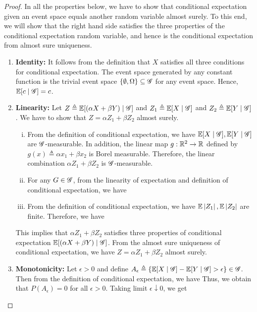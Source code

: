 \documentclass[letterpaper,10pt,english]{article}
\begin{document}
\begin{proof}
In all the properties below, we have to show that conditional expectation given an event space equals another random variable almost surely. 
To this end, we will show that the right hand side satisfies the three properties of the conditional expectation random variable, 
and hence is the conditional expectation from almost sure uniqueness.  
\begin{enumerate}
\item \textbf{Identity:} It follows from the definition that $X$ satisfies all three conditions for conditional expectation.  
The event space generated by any constant function is the trivial event space $\left\{\emptyset, \Omega\right\} \subseteq \mathscr{G}$ for any event space. 
Hence, $\mathbb{E}[c\mid \mathscr{G}] = c$.  
\item \textbf{Linearity:} 
Let $Z \triangleq \mathbb{E}[(\alpha X + \beta Y) \mid \mathscr{G}]$ and $Z_1 \triangleq \mathbb{E}[X\mid\mathscr{G}]$ and $Z_2\triangleq\mathbb{E}[Y\mid\mathscr{G}]$. 
We have to show that $Z = \alpha Z_1+ \beta Z_2$ almost surely. 
\begin{enumerate}[(i)]
\item From the definition of conditional expectation, we have $\mathbb{E}[X\mid\mathscr{G}], \mathbb{E}[Y\mid\mathscr{G}]$ are $\mathscr{G}$-measurable. 
In addition, the linear map $g: \mathbb{R}^2\to\mathbb{R}$ defined by $g(x) \triangleq \alpha x_1 + \beta x_2$ is Borel measurable. 
Therefore, the linear combination $\alpha Z_1 + \beta Z_2$ is $\mathscr{G}$-measurable. 
\item For any $G \in \mathscr{G}$, from the linearity of expectation and definition of conditional expectation, we have 
\item From the definition of conditional expectation, we have $\mathbb{E}\left\lvert Z_1\right\rvert, \mathbb{E}\left\lvert Z_2\right\rvert$ are finite. 
Therefore, we have 
\end{enumerate}
This implies that $\alpha Z_1 + \beta Z_2$ satisfies three properties of conditional expectation $\mathbb{E}[(\alpha X +\beta Y)\mid\mathscr{G}]$. 
From the almost sure uniqueness of conditional expectation, we have $Z = \alpha Z_1 + \beta Z_2$ almost surely. 

\item \textbf{Monotonicity:} Let $\epsilon > 0$ and define $A_\epsilon \triangleq \left\{\mathbb{E}[X\mid\mathscr{G}] - \mathbb{E}[Y\mid \mathscr{G}] >\epsilon\right\} \in  \mathscr{G}$.  
Then from the definition of conditional expectation, we have 
Thus, we obtain  that $P(A_\epsilon) = 0$ for all $\epsilon > 0$. 
Taking limit $\epsilon \downarrow 0$, we get 


\end{enumerate}
\end{proof}
\end{document}

